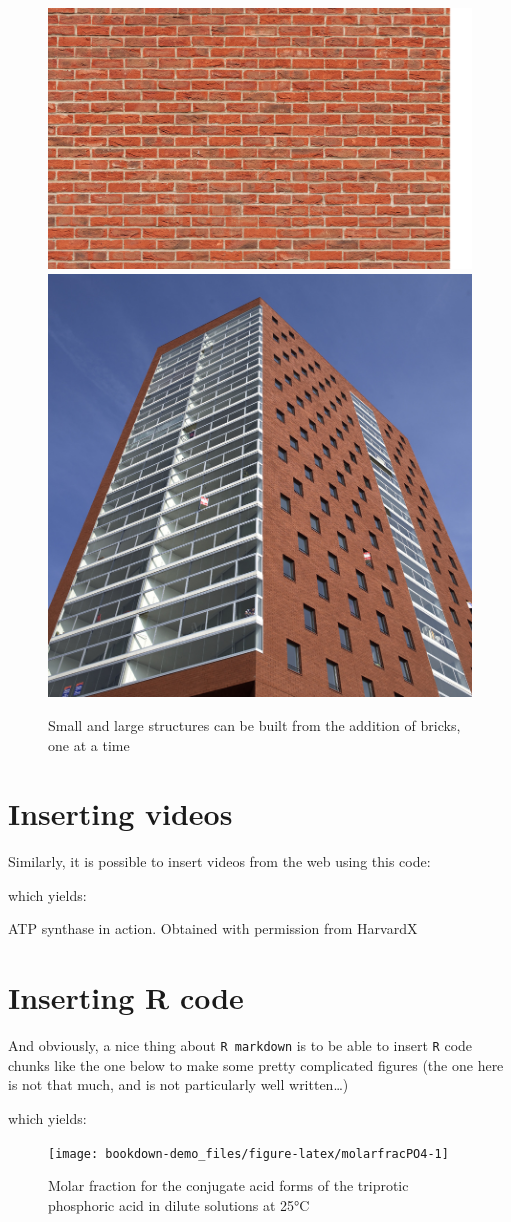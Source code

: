 \documentclass[]{book}
\theoremstyle{definition}
\theoremstyle{definition}
\theoremstyle{definition}
\theoremstyle{remark}
\begin{document}
\begin{figure}

{\centering \includegraphics[width=0.4\linewidth]{pictures/brickwall} \includegraphics[width=0.4\linewidth]{pictures/brick-skyscraper} 

}

\caption{Small and large structures can be built from the addition of bricks, one at a time}\label{fig:brickwall}
\end{figure}

\section{Inserting videos}\label{inserting-videos}

Similarly, it is possible to insert videos from the web using this code:

which yields:

\label{fig:ATPaseRotation}ATP synthase in action. Obtained with permission
from HarvardX

\section{Inserting R code}\label{inserting-r-code}

And obviously, a nice thing about \texttt{R\ markdown} is to be able to
insert \texttt{R} code chunks like the one below to make some pretty
complicated figures (the one here is not that much, and is not
particularly well written\ldots{})

which yields:

\begin{figure}

{\centering \texttt{[image: bookdown-demo\_files/figure-latex/molarfracPO4-1]} 

}

\caption{Molar fraction for the conjugate acid forms of the triprotic phosphoric acid in dilute solutions at 25°C}\label{fig:molarfracPO4}
\end{figure}
\end{document}
